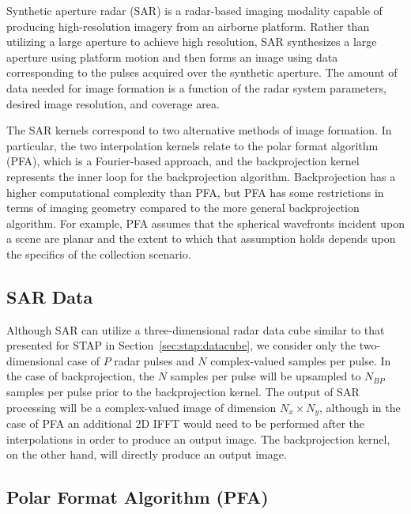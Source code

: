 \documentclass{report}
\begin{document}
Synthetic aperture radar (SAR) is a radar-based imaging modality capable
of producing high-resolution imagery from an airborne platform.
Rather than utilizing a large aperture to achieve high resolution, SAR
synthesizes a large aperture using platform motion and then forms an
image using data corresponding to the pulses acquired over the synthetic
aperture.
The amount of data needed for image formation is a function of the radar
system parameters, desired image resolution, and coverage area.

The SAR kernels correspond to two alternative methods of image formation.
In particular, the two interpolation kernels relate to the polar format
algorithm (PFA), which is a Fourier-based approach, and the backprojection
kernel represents the inner loop for the backprojection algorithm.
Backprojection has a higher computational complexity than PFA, but PFA has
some restrictions in terms of imaging geometry compared to the more general
backprojection algorithm.
For example, PFA assumes that the spherical wavefronts incident upon a
scene are planar and the extent to which that assumption holds depends
upon the specifics of the collection scenario.

\subsection{SAR Data}

Although SAR can utilize a three-dimensional radar data cube similar to
that presented for STAP in Section~\ref{sec:stap:datacube}, we consider
only the two-dimensional case of $P$ radar pulses and $N$ 
complex-valued samples per pulse.
In the case of backprojection, the $N$ samples per pulse will be upsampled
to $N_{BP}$ samples per pulse prior to the backprojection kernel.
The output of SAR processing will be a complex-valued image of dimension
$N_x \times N_y$, although in the case of PFA an additional 2D IFFT would
need to be performed after the interpolations in order to produce an
output image.
The backprojection kernel, on the other hand, will directly produce an
output image.

\subsection{Polar Format Algorithm (PFA)}
\end{document}
